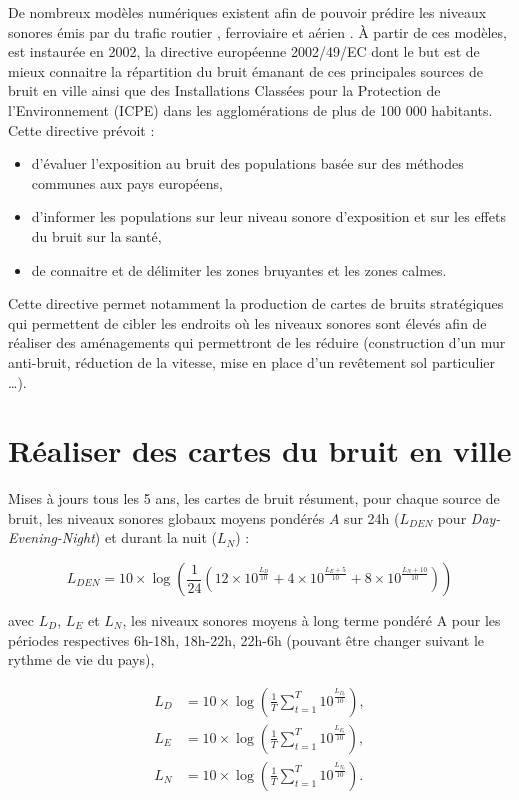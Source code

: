 De nombreux modèles numériques existent afin de pouvoir prédire les niveaux sonores émis par du trafic routier \cite{quartieri2009review}, ferroviaire \cite{van2000railway} et aérien \cite{zaporozhets1998aircraft}.
À partir de ces modèles, est instaurée en 2002, la directive européenne 2002/49/EC dont le but est de mieux connaitre la répartition du bruit émanant de ces principales sources de bruit en ville ainsi que des Installations Classées pour la Protection de l'Environnement (ICPE) dans les agglomérations de plus de 100 000 habitants. Cette directive prévoit : 

\begin{itemize}
	\item d'évaluer l'exposition au bruit des populations basée sur des méthodes communes aux pays européens,
	\item d'informer les populations sur leur niveau sonore d'exposition et sur les effets du bruit sur la santé,
	\item de connaitre et de délimiter les zones bruyantes et les zones calmes.\\
\end{itemize}

Cette directive permet notamment la production de cartes de bruits stratégiques qui permettent de cibler les endroits où les niveaux sonores sont élevés afin de réaliser des aménagements qui permettront de les réduire (construction d'un mur anti-bruit, réduction de la vitesse, mise en place d'un revêtement sol particulier \dots).


\section{Réaliser des cartes du bruit en ville}
Mises à jours tous les 5 ans, les cartes de bruit résument, pour chaque source de bruit, les niveaux sonores globaux moyens pondérés $A$ sur 24h ($L_{DEN}$ pour \textit{Day-Evening-Night}) et durant la nuit ($L_N$) : 

\begin{equation}
L_{DEN} = 10\times\log \left(\frac{1}{24} \left(12\times10^{\frac{L_D}{10}}+4\times10^{\frac{L_E+5}{10}}+8\times10^{\frac{L_N+10}{10}} \right)\right)
\end{equation} 

avec $L_D$, $L_E$ et $L_N$, les niveaux sonores moyens à long terme pondéré A pour les périodes respectives 6h-18h, 18h-22h, 22h-6h (pouvant être changer suivant le rythme de vie du pays), 

\begin{subequations}
\begin{align}
L_D &= 10\times\log\left(\frac{1}{T} \sum_{t = 1}^{T}10^{\frac{L_{D_t}}{10}}\right),\\
L_E &= 10\times\log\left(\frac{1}{T} \sum_{t = 1}^{T}10^{\frac{L_{E_t}}{10}}\right),\\
L_N &= 10\times\log\left(\frac{1}{T} \sum_{t = 1}^{T}10^{\frac{L_{N_t}}{10}}\right).
\end{align}
\end{subequations}

